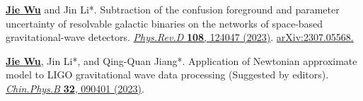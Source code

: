 \begin{cvpublications}
\begin{pubitems}
\item \textbf{\underline{Jie Wu}} and Jin Li*. Subtraction of the confusion foreground and parameter uncertainty of resolvable galactic binaries on the networks of space-based gravitational-wave detectors. \href{https://journals.aps.org/prd/abstract/10.1103/PhysRevD.108.124047}{\textit{Phys.Rev.D} \textbf{108}, 124047 (2023)}. \href{https://arxiv.org/abs/2307.05568}{arXiv:2307.05568.}

\item \textbf{\underline{Jie Wu}}, Jin Li*, and Qing-Quan Jiang*. Application of Newtonian approximate model to LIGO gravitational wave data processing (Suggested by editors). \href{https://cpb.iphy.ac.cn/EN/10.1088/1674-1056/acd8a3}{\textit{Chin.Phys.B} \textbf{32}, 090401 (2023)}.
\end{pubitems}
\end{cvpublications}


